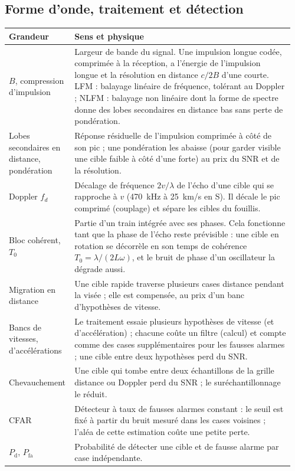\documentclass[11pt,a4paper]{article}
\newcommand{\Pd}{P_{\mathrm d}}
\newcommand{\Pfa}{P_{\mathrm{fa}}}
\begin{document}
\subsection{Forme d'onde, traitement et détection}
{\small
\begin{longtable}{@{}p{0.2\linewidth}p{0.76\linewidth}@{}}
\toprule
Grandeur & Sens et physique\\
\midrule
\endhead
$B$, compression d'impulsion & Largeur de bande du signal. Une impulsion longue codée, comprimée à la réception, a
l'énergie de l'impulsion longue et la résolution en distance $c/2B$ d'une courte. LFM : balayage linéaire de
fréquence, tolérant au Doppler ; NLFM : balayage non linéaire dont la forme de spectre donne des lobes secondaires en
distance bas sans perte de pondération.\\
Lobes secondaires en distance, pondération & Réponse résiduelle de l'impulsion comprimée à côté de son pic ; une
pondération les abaisse (pour garder visible une cible faible à côté d'une forte) au prix du SNR et de la résolution.\\
Doppler $f_d$ & Décalage de fréquence $2v/\lambda$ de l'écho d'une cible qui se rapproche à $v$ (\SI{470}{kHz} à
\SI{25}{km/s} en S). Il décale le pic comprimé (couplage) et sépare les cibles du fouillis.\\
Bloc cohérent, $T_0$ & Partie d'un train intégrée avec ses phases. Cela fonctionne tant que la phase de l'écho reste
prévisible : une cible en rotation se décorrèle en son temps de cohérence $T_0 = \lambda/(2L\omega)$, et le bruit de
phase d'un oscillateur la dégrade aussi.\\
Migration en distance & Une cible rapide traverse plusieurs cases distance pendant la visée ; elle est compensée, au
prix d'un banc d'hypothèses de vitesse.\\
Bancs de vitesses, d'accélérations & Le traitement essaie plusieurs hypothèses de vitesse (et d'accélération) ; chacune
coûte un filtre (calcul) et compte comme des cases supplémentaires pour les fausses alarmes ; une cible entre deux
hypothèses perd du SNR.\\
Chevauchement & Une cible qui tombe entre deux échantillons de la grille distance ou Doppler perd du SNR ; le
suréchantillonnage le réduit.\\
CFAR & Détecteur à taux de fausses alarmes constant : le seuil est fixé à partir du bruit mesuré dans les cases
voisines ; l'aléa de cette estimation coûte une petite perte.\\
$\Pd$, $\Pfa$ & Probabilité de détecter une cible et de fausse alarme par case indépendante.\\

\end{longtable}}
\end{document}
